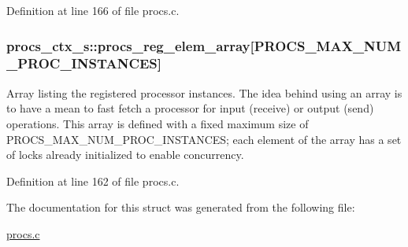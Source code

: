 Definition at line 166 of file procs.\+c.

\subsubsection[{\texorpdfstring{procs\+\_\+reg\+\_\+elem\+\_\+array}{procs_reg_elem_array}}]{ procs\+\_\+ctx\+\_\+s\+::procs\+\_\+reg\+\_\+elem\+\_\+array\mbox{[}{\bf P\+R\+O\+C\+S\+\_\+\+M\+A\+X\+\_\+\+N\+U\+M\+\_\+\+P\+R\+O\+C\+\_\+\+I\+N\+S\+T\+A\+N\+C\+ES}\mbox{]}}\hypertarget{structprocs__ctx__s_a08985565adf1f547b44b58addd85cbbe}{}\label{structprocs__ctx__s_a08985565adf1f547b44b58addd85cbbe}
Array listing the registered processor instances. The idea behind using an array is to have a mean to fast fetch a processor for input (receive) or output (send) operations. This array is defined with a fixed maximum size of P\+R\+O\+C\+S\+\_\+\+M\+A\+X\+\_\+\+N\+U\+M\+\_\+\+P\+R\+O\+C\+\_\+\+I\+N\+S\+T\+A\+N\+C\+ES; each element of the array has a set of locks already initialized to enable concurrency. 

Definition at line 162 of file procs.\+c.



The documentation for this struct was generated from the following file\+:\begin{DoxyCompactItemize}
\item 
\hyperlink{procs_8c}{procs.\+c}\end{DoxyCompactItemize}
